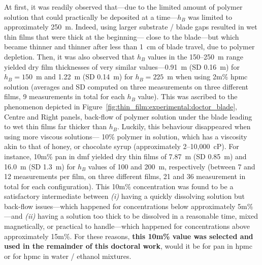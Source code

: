 At first, it was readily observed that---due to the limited amount of polymer solution that could practically be deposited at a time---$h_B$ was limited to approximately 250~\textmu{}m. Indeed, using larger substrate / blade gaps resulted in wet thin films that were thick at the beginning---\ie{} close to the blade---but which became thinner and thinner after less than 1~cm of blade travel, due to polymer depletion. Then, it was also observed that $h_B$ values in the 150--250~\textmu{}m range yielded dry film thicknesses of very similar values---0.91~\textmu{}m (SD 0.16~\textmu{}m) for $h_B=150$~\textmu{}m and 1.22~\textmu{}m (SD 0.14~\textmu{}m) for $h_B=225$~\textmu{}m when using 2m\% \gls{hpmc} solution (averages and SD computed on three measurements on three different films, 9 measurements in total for each $h_B$ value). This was ascribed to the phenomenon depicted in Figure~\ref{fig:thin_film:experimental:doctor_blade}, Centre and Right panels, \ie{} back-flow of polymer solution under the blade leading to wet thin films far thicker than $h_B$. Luckily, this behaviour disappeared when using more viscous solutions---\eg{} 10\% polymer in solution, which has a viscosity akin to that of honey, or chocolate syrup (approximately 2--10,000~cP). For instance, 10m\% \gls{pan} in \gls{dmf} yielded dry thin films of 7.87~\textmu{}m (SD 0.85~\textmu{}m) and 16.0~\textmu{}m (SD 1.3~\textmu{}m) for $h_B$ values of 100 and 200~\textmu{}m, respectively (between 7 and 12 measurements per film, on three different films, 21 and 36 measurement in total for each configuration). This 10m\% concentration was found to be a satisfactory intermediate between \textit{(i)} having a quickly dissolving solution but back-flow issues---which happened for concentrations below approximately 5m\%---and \textit{(ii)} having a solution too thick to be dissolved in a reasonable time, mixed magnetically, or practical to handle---which happened for concentrations above approximately 15m\%. For these reasons, \textbf{this 10m\% value was selected and used in the remainder of this doctoral work}, would it be for \gls{pan} in \gls{hpmc} or for \gls{hpmc} in water / ethanol mixtures.


